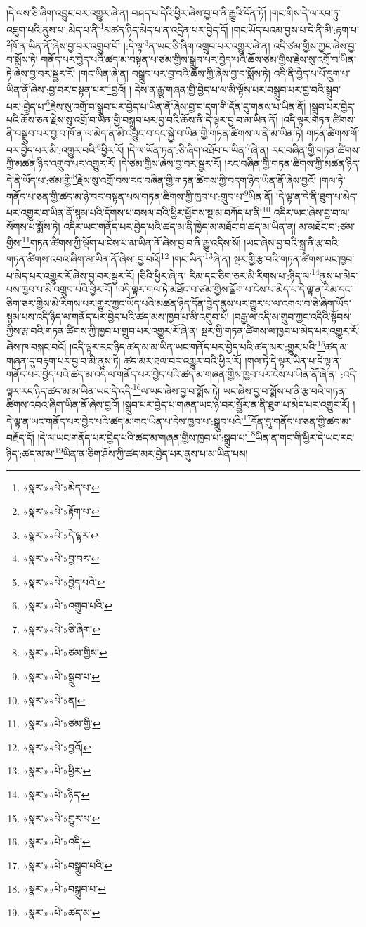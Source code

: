 །དེ་ལས་ཅི་ཞིག་འབྱུང་བར་འགྱུར་ཞེ་ན། བཤད་པ་དེའི་ཕྱིར་ཞེས་བྱ་བ་ནི་རྒྱུའི་དོན་ཏོ། །གང་གིས་དེ་ལ་རབ་ཏུ་འཇུག་པའི་ནུས་པ་:མེད་པ་ནི་\footnote{«སྣར་»«པེ་»མེད་པ་}མཚན་ཉིད་མེད་པ་ན་འདྲེན་པར་བྱེད་དོ། །གང་ཡོད་པའམ་བྱས་པ་དེ་ནི་མི་:རྟག་པ་\footnote{«སྣར་»«པེ་»རྟོག་པ་}ཁོ་ན་ཡིན་ནོ་ཞེས་བྱ་བར་འགྲུབ་བོ། །:དེ་ལྟ་\footnote{«སྣར་»«པེ་»དེ་ལྟར་}ན་ཡང་ཅི་ཞིག་འགྲུབ་པར་འགྱུར་ཞེ་ན། འདི་ཙམ་གྱིས་ཀྱང་ཞེས་བྱ་བ་སྨོས་ཏེ། གནོད་པར་བྱེད་པའི་ཚད་མ་བསྟན་པ་ཙམ་གྱིས་སྒྲུབ་པར་བྱེད་པའི་ཆོས་ཙམ་གྱིས་རྗེས་སུ་འགྲོ་བ་ཡིན་ཏེ་ཞེས་བྱ་བར་སྦྱར་རོ། །གང་ཡིན་ཞེ་ན། བསྒྲུབ་པར་བྱ་བའི་ཆོས་ཀྱི་ཞེས་བྱ་བ་སྨོས་ཏེ། འདི་ནི་བྱེད་པ་པོ་དྲུག་པ་ཡིན་ནོ་ཞེས་:བྱ་བར་བསྟན་པར་\footnote{«སྣར་»«པེ་»བྱ་བར་}བྱའོ། །
དེས་ན་རྒྱུ་གཞན་གྱི་བྱེད་པ་ལ་མི་ལྟོས་པར་བསྒྲུབ་པར་བྱ་བའི་སྒྲུབ་པར་:བྱེད་པ་\footnote{«སྣར་»«པེ་»བྱེད་པའི་}རྗེས་སུ་འགྲོ་བ་སྒྲུབ་པར་བྱེད་པ་ཡིན་ནོ་ཞེས་བྱ་བ་དག་གི་དོན་དུ་གནས་པ་ཡིན་ནོ། །སྒྲུབ་པར་བྱེད་པའི་ཆོས་ཅན་རྗེས་སུ་འགྲོ་བ་ཡིན་གྱི་བསྒྲུབ་པར་བྱ་བའི་ཆོས་ནི་དེ་ལྟར་བྱ་བ་མ་ཡིན་ནོ། །འདི་ལྟར་གཏན་ཚིགས་ནི་བསྒྲུབ་པར་བྱ་བ་ཁོ་ན་ལ་མེད་ན་མི་འབྱུང་བ་དང་སྐྱེ་བ་ཡིན་གྱི་གཏན་ཚིགས་ལ་ནི་མ་ཡིན་ཏེ། གཏན་ཚིགས་གོ་བར་བྱེད་པར་མི་:འགྱུར་བའི་\footnote{«སྣར་»«པེ་»འགྲུབ་པའི་}ཕྱིར་རོ། །དེ་ལ་ཡོན་ཏན་:ཅི་ཞིག་འཐོབ་པ་ཡིན་\footnote{«སྣར་»«པེ་»ཅི་ཞིག་}ཞེ་ན། རང་བཞིན་གྱི་གཏན་ཚིགས་ཀྱི་མཚན་ཉིད་འགྲུབ་པར་འགྱུར་རོ། །དེ་ཙམ་གྱིས་ཞེས་བྱ་བར་སྦྱར་རོ། །རང་བཞིན་གྱི་གཏན་ཚིགས་ཀྱི་མཚན་ཉིད་དེ་ནི་ཡོད་པ་:ཙམ་གྱི་\footnote{«སྣར་»«པེ་»ཙམ་གྱིས་}རྗེས་སུ་འགྲོ་བས་རང་བཞིན་གྱི་གཏན་ཚིགས་ཀྱི་བདག་ཉིད་ཡིན་ནོ་ཞེས་བྱའོ། །གལ་ཏེ་གནོད་པ་ཅན་གྱི་ཚད་མ་ཉེ་བར་བསྟན་པས་གཏན་ཚིགས་ཀྱི་ཁྱབ་པ་:གྲུབ་པ་\footnote{«སྣར་»«པེ་»སྒྲུབ་པ་}ཡིན་ནོ། །དེ་ལྟ་ན་དེ་ནི་ཐུག་པ་མེད་པར་འགྱུར་བ་ཡིན་ནོ་སྙམ་པའི་དོགས་པ་བསལ་བའི་ཕྱིར་ཕྱོགས་སྔ་མ་བཀོད་པ་ནི།\footnote{«སྣར་»«པེ་»ན།} འདིར་ཡང་ཞེས་བྱ་བ་ལ་སོགས་པ་སྨོས་ཏེ། འདིར་ཡང་གནོད་པར་བྱེད་པའི་ཚད་མ་ནི་ཁྱེད་མ་མཐོང་བ་ཚད་མ་ཡིན་ན། མ་མཐོང་བ་:ཙམ་གྱིས་\footnote{«སྣར་»«པེ་»ཙམ་གྱི་}གཏན་ཚིགས་ཀྱི་ལྡོག་པ་ངེས་པ་མ་ཡིན་ནོ་ཞེས་བྱ་བ་ནི་རྒྱུ་འདིས་སོ། །ཡང་ཞེས་བྱ་བའི་སྒྲ་ནི་རྩ་བའི་གཏན་ཚིགས་འབའ་ཞིག་མ་ཡིན་ནོ་ཞེས་:བྱ་བའོ།\footnote{«སྣར་»«པེ་»བྱའོ།} །གང་ཡིན་\footnote{«སྣར་»«པེ་»ཕྱིར་}ཞེ་ན། སྔར་གྱི་རྩ་བའི་གཏན་ཚིགས་ཡང་ཁྱབ་པ་མེད་པར་འགྱུར་རོ་ཞེས་བྱ་བར་སྦྱར་རོ། །ཅིའི་ཕྱིར་ཞེ་ན། རིམ་དང་ཅིག་ཅར་མི་རིགས་པ་:ཉིད་ལ་\footnote{«སྣར་»«པེ་»ཉིད་}ནུས་པ་མེད་པས་ཁྱབ་པ་མི་འགྲུབ་པའི་ཕྱིར་རོ། །འདི་ལྟར་གལ་ཏེ་མཐོང་བ་ཙམ་གྱིས་ལྡོག་པ་ངེས་པ་མེད་པ་དེ་ལྟ་ན་རིམ་དང་ཅིག་ཅར་གྱིས་མི་རིགས་པར་གྱུར་ཀྱང་ཡོད་པའི་མཚན་ཉིད་དོན་བྱེད་ནུས་པར་གྱུར་པ་ལ་འགལ་བ་ཅི་ཞིག་ཡོད་སྙམ་པས་འདི་ཉིད་ལ་གནོད་པར་བྱེད་པའི་ཚད་མས་ཁྱབ་པ་མི་འགྲུབ་པོ། །བརྒྱ་ལ་འདི་མ་གྲུབ་ཀྱང་འདིའི་སྟོབས་ཀྱིས་རྩ་བའི་གཏན་ཚིགས་ཀྱི་ཁྱབ་པ་གྲུབ་པར་འགྱུར་རོ་ཞེ་ན། སྔར་གྱི་གཏན་ཚིགས་ལ་ཁྱབ་པ་མེད་པར་འགྱུར་རོ་ཞེས་ཁ་བསྐང་བའོ། །འདི་ལྟར་རང་ཉིད་ཚད་མ་མ་ཡིན་ཡང་གནོད་པར་བྱེད་པའི་ཚད་མར་:གྱུར་པའི་\footnote{«སྣར་»«པེ་»གྱུར་པ་}ཚད་མ་གཞན་དུ་བརྟག་པར་བྱ་བ་མི་ནུས་ཏེ། ཚད་མར་ཐལ་བར་འགྱུར་བའི་ཕྱིར་རོ། །གལ་ཏེ་དེ་ལྟར་ཡིན་པ་དེ་ལྟ་ན་གནོད་པར་བྱེད་པའི་ཚད་མ་འདི་ལ་གནོད་པར་བྱེད་པའི་ཚད་མ་གཞན་གྱིས་ཁྱབ་པར་ངེས་པ་ཡིན་ནོ་ཞེ་ན། :འདི་ལྟར་རང་ཉིད་ཚད་མ་མ་ཡིན་ཡང་དེ་འདི་\footnote{«སྣར་»«པེ་»འདི་}ལ་ཡང་ཞེས་བྱ་བ་སྨོས་ཏེ། ཡང་ཞེས་བྱ་བ་སྨོས་པ་ནི་རྩ་བའི་གཏན་ཚིགས་འབའ་ཞིག་ཡིན་ནོ་ཞེས་བྱའོ། །སྒྲུབ་པར་བྱེད་པ་གཞན་ཡང་ཉེ་བར་སྦྱོར་ན་ནི་ཐུག་པ་མེད་པར་འགྱུར་རོ། །དེ་ལྟ་ན་ཡང་གནོད་པར་བྱེད་པའི་ཚད་མ་གང་ཡིན་པ་དེས་ཁྱབ་པ་:སྒྲུབ་པའི་\footnote{«སྣར་»«པེ་»བསྒྲུབ་པའི་}དོན་དུ་གནོད་པ་ཅན་གྱི་ཚད་མ་བརྗོད་དོ། །དེ་ལ་ཡང་གནོད་པར་བྱེད་པའི་ཚད་མ་གཞན་གྱིས་ཁྱབ་པ་:སྒྲུབ་པ་\footnote{«སྣར་»«པེ་»བསྒྲུབ་པ་}ཡིན་ན་གང་གི་ཕྱིར་དེ་ཡང་རང་ཉིད་:ཚད་མ་མ་\footnote{«སྣར་»«པེ་»ཚད་མ་}ཡིན་ན་ཅིག་ཤོས་ཀྱི་ཚད་མར་བྱེད་པར་ནུས་པ་མ་ཡིན་པས། 